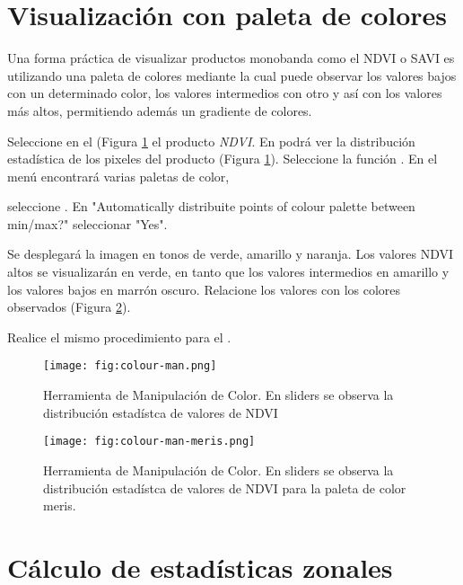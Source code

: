 \section{Visualización con paleta de colores}

Una forma práctica de visualizar productos monobanda como el NDVI o SAVI es utilizando una paleta de colores mediante la cual puede observar los valores bajos con un determinado color, los valores intermedios con otro y así con los valores más altos, permitiendo además un gradiente de colores. %

Seleccione en el  (Figura \ref{fig:color-man} el producto \emph{NDVI}. En  podrá ver la distribución estadística de los pixeles del producto (Figura \ref{fig:color-man}). Seleccione la función . En el menú encontrará varias paletas de color,

seleccione  . En "Automatically distribuite points of colour palette between min/max?" seleccionar "Yes".

Se desplegará la imagen en tonos de verde, amarillo y naranja. Los valores NDVI altos se visualizarán en verde, en tanto que los valores intermedios en amarillo y los valores bajos en marrón oscuro. Relacione los valores con los colores observados (Figura \ref{fig:color-man-meris}).

Realice el mismo procedimiento para el .

\begin{figure}[h!]
    \centering
    \texttt{[image: fig:colour-man.png]}
    \caption{Herramienta de Manipulación de Color. En sliders se observa la distribución estadístca de valores de NDVI}
    \label{fig:color-man}
\end{figure}

\begin{figure}[h!]
    \centering
    \texttt{[image: fig:colour-man-meris.png]}
    \caption{Herramienta de Manipulación de Color. En sliders se observa la distribución estadístca de valores de NDVI para la paleta de color meris.}
    \label{fig:color-man-meris}
\end{figure}

\section{Cálculo de estadísticas zonales}

